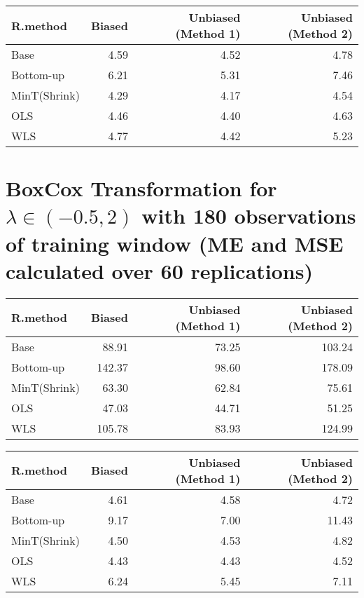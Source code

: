 \documentclass[
]{article}
\begin{document}
\begin{tabular}{l|r|r|r}
\hline
R.method & Biased & Unbiased (Method 1) & Unbiased (Method 2)\\
\hline
Base & 4.59 & 4.52 & 4.78\\
\hline
Bottom-up & 6.21 & 5.31 & 7.46\\
\hline
MinT(Shrink) & 4.29 & 4.17 & 4.54\\
\hline
OLS & 4.46 & 4.40 & 4.63\\
\hline
WLS & 4.77 & 4.42 & 5.23\\
\hline
\end{tabular}

\hypertarget{boxcox-transformation-for-lambda-in--0.52-with-180-observations-of-training-window-me-and-mse-calculated-over-60-replications}{%
\section{\texorpdfstring{BoxCox Transformation for
\(\lambda \in (-0.5,2)\) with 180 observations of training window (ME
and MSE calculated over 60
replications)}{BoxCox Transformation for \textbackslash lambda \textbackslash in (-0.5,2) with 180 observations of training window (ME and MSE calculated over 60 replications)}}\label{boxcox-transformation-for-lambda-in--0.52-with-180-observations-of-training-window-me-and-mse-calculated-over-60-replications}}

\begin{tabular}{l|r|r|r}
\hline
R.method & Biased & Unbiased (Method 1) & Unbiased (Method 2)\\
\hline
Base & 88.91 & 73.25 & 103.24\\
\hline
Bottom-up & 142.37 & 98.60 & 178.09\\
\hline
MinT(Shrink) & 63.30 & 62.84 & 75.61\\
\hline
OLS & 47.03 & 44.71 & 51.25\\
\hline
WLS & 105.78 & 83.93 & 124.99\\
\hline
\end{tabular}

\begin{tabular}{l|r|r|r}
\hline
R.method & Biased & Unbiased (Method 1) & Unbiased (Method 2)\\
\hline
Base & 4.61 & 4.58 & 4.72\\
\hline
Bottom-up & 9.17 & 7.00 & 11.43\\
\hline
MinT(Shrink) & 4.50 & 4.53 & 4.82\\
\hline
OLS & 4.43 & 4.43 & 4.52\\
\hline
WLS & 6.24 & 5.45 & 7.11\\
\hline
\end{tabular}
\end{document}
